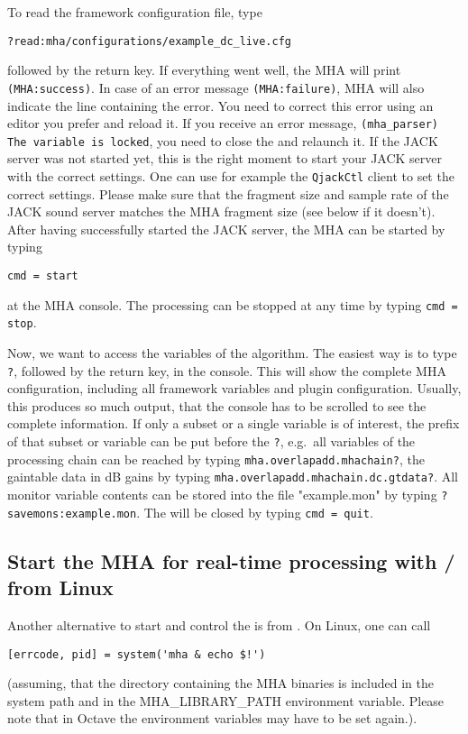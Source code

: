 To read the framework configuration file, type
\begin{verbatim}
?read:mha/configurations/example_dc_live.cfg
\end{verbatim}
followed by the return key. If everything went well, the MHA will print
\verb!(MHA:success)!. In case of an error message \verb!(MHA:failure)!, MHA 
will also indicate the line containing the error. You need to correct this 
error using an editor you prefer and  reload it. If you receive an error 
message, \verb!(mha_parser) The variable is locked!, you need to close the 
\mhad{} and relaunch it. If the JACK server was not started yet, this is the
right moment to start your JACK server with the correct settings. One can use 
for example the \verb!QjackCtl! client to set the correct settings.
Please make sure that the fragment size and sample rate of the JACK
sound server matches the MHA fragment size (see below if it
doesn't). After having successfully started the JACK server, the MHA
can be started by typing
\begin{verbatim}
cmd = start
\end{verbatim}
at the MHA console. The processing can be stopped at any time by
typing \verb!cmd = stop!.

Now, we want to access the variables of the algorithm. The easiest way
is to type \verb!?!, followed by the return key, in the console. This
will show the complete MHA configuration, including all framework
variables and plugin configuration. Usually, this
produces so much output, that the console has to be scrolled to see
the complete information. If only a subset or a single variable is of
interest, the prefix of that subset or variable can be put before the
\verb!?!, e.g.\ all variables of the processing chain can be reached
by typing \newline\verb!mha.overlapadd.mhachain?!, the gaintable data in dB gains
by typing \newline\verb!mha.overlapadd.mhachain.dc.gtdata?!. All monitor variable contents can
be stored into the file "example.mon" by typing
\verb!?savemons:example.mon!. The \mhad{} will be closed
by typing \verb!cmd = quit!.

\subsection{Start the MHA for real-time processing with \Octave{}/\Matlab{} from Linux}%
%
Another alternative to start and control the \mhad{} is from \Matlab{}. On Linux, one can call
\begin{verbatim}
[errcode, pid] = system('mha & echo $!')
\end{verbatim}
(assuming, that the directory containing the MHA binaries is included
in the system path and in the MHA\_LIBRARY\_PATH environment
variable. Please note that in Octave the environment variables 
may have to be set again.).

